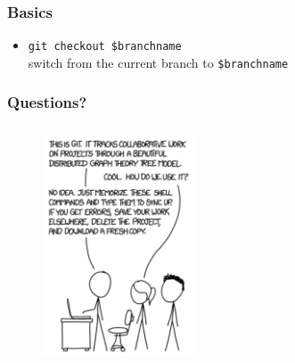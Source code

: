 \documentclass{beamer}
\begin{document}
\begin{frame}[fragile]
\frametitle{Basics}
\begin{itemize}
\item \verb!git checkout $branchname! \\
switch from the current branch to \verb!$branchname!
\end{itemize}
\end{frame}

\begin{frame}[fragile]
\frametitle{Questions?}
\begin{figure}
\centering
\includegraphics[height=7cm, width=4.5cm]{questions}
\end{figure}
\end{frame}
\end{document}
